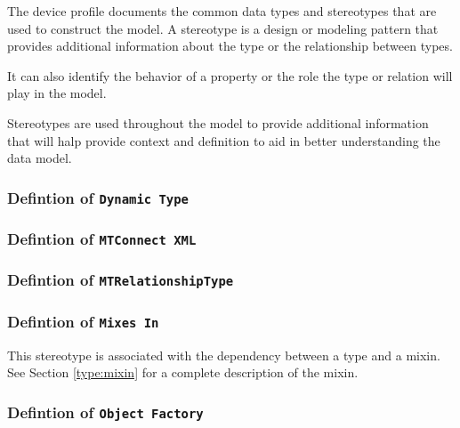 \FloatBarrier


The device profile documents the common data types and stereotypes that are 
used to construct the model. A stereotype is a design or modeling pattern that 
provides additional information about the type or the relationship between types. 

It can also identify the behavior of a property or the role the type or relation
will play in the model. 

Stereotypes are used throughout the model to provide additional information that 
will halp provide context and definition to aid in better understanding the
data model.

\subsubsection{Defintion of  \texttt{Dynamic Type}} \label{type:Dynamic Type}

\FloatBarrier



\subsubsection{Defintion of  \texttt{MTConnect XML}} \label{type:MTConnect XML}

\FloatBarrier



\subsubsection{Defintion of  \texttt{MTRelationshipType}} \label{type:MTRelationshipType}

\FloatBarrier



\subsubsection{Defintion of  \texttt{Mixes  In}} \label{type:Mixes  In}

\FloatBarrier

This stereotype is associated with the dependency between a type and a mixin. See Section \ref{type:mixin} for a complete 
description of the mixin.

\subsubsection{Defintion of  \texttt{Object Factory}} \label{type:Object Factory}


